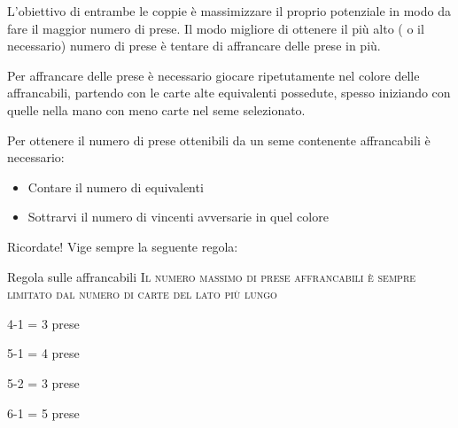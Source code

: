 \documentclass[../corsofiori.tex]{subfiles}
\begin{document}
L'obiettivo di entrambe le coppie è massimizzare il proprio potenziale in modo da fare il maggior numero di prese. Il
modo migliore di ottenere il più alto ( o il necessario) numero di prese è tentare di affrancare delle prese in più.

Per affrancare delle prese è necessario giocare ripetutamente nel colore delle affrancabili, partendo con le carte alte
equivalenti possedute, spesso iniziando con quelle nella mano con meno carte nel seme selezionato.

Per ottenere il numero di prese ottenibili da un seme contenente affrancabili è necessario:
\begin{itemize}
    \item Contare il numero di equivalenti
    \item Sottrarvi il numero di vincenti avversarie in quel colore
\end{itemize}

Ricordate! Vige sempre la seguente regola:

\medskip
\begin{regola}{Regola sulle affrancabili}
    \textsc{Il numero massimo di prese affrancabili è sempre limitato dal numero di carte del lato più lungo}
\end{regola}
\bigskip

\begin{minipage}[h][3cm][t]{.23\linewidth}

    \medskip

    4-1 = 3 prese
\end{minipage}\hfill
\begin{minipage}[h][3cm][t]{.23\linewidth}

    \medskip

    5-1 = 4 prese
\end{minipage}\hfill
\begin{minipage}[h][3cm][t]{.23\linewidth}

    \medskip

    5-2 = 3 prese
\end{minipage}\hfill
\begin{minipage}[h][3cm][t]{.23\linewidth}

    \medskip

    6-1 = 5 prese
\end{minipage}
\end{document}
